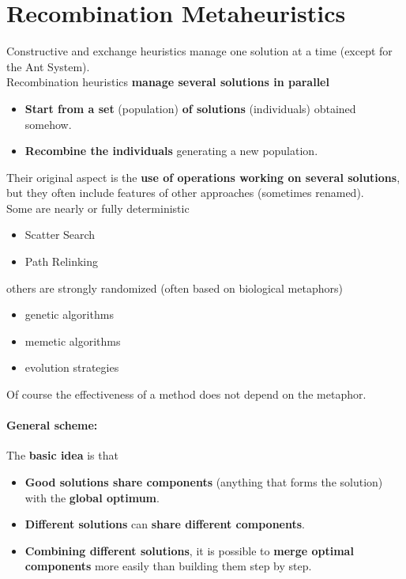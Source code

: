 \section{Recombination Metaheuristics}

Constructive and exchange heuristics manage one solution at a time (except for the Ant System).\\

Recombination heuristics \textbf{manage several solutions in parallel}
\begin{itemize}
	\item \textbf{Start from a set} (population) \textbf{of solutions} (individuals) obtained somehow.\\
	
	\item \textbf{Recombine the individuals} generating a new population.\\
\end{itemize}

Their original aspect is the \textbf{use of operations working on several solutions}, but they often include features of other approaches (sometimes renamed).\\

Some are nearly or fully deterministic
\begin{itemize}
	\item Scatter Search
	\item Path Relinking
\end{itemize}

others are strongly randomized (often based on biological metaphors)
\begin{itemize}
	\item genetic algorithms
	\item memetic algorithms
	\item evolution strategies
\end{itemize}

Of course the effectiveness of a method does not depend on the metaphor.\\

\newpage

\paragraph{General scheme:} The \textbf{basic idea} is that
\begin{itemize}
	\item \textbf{Good solutions share components} (anything that forms the solution) with the \textbf{global optimum}.\\
	
	\item \textbf{Different solutions} can \textbf{share different components}.\\
	
	\item \textbf{Combining different solutions}, it is possible to \textbf{merge optimal components} more easily than building them step by step.\\
\end{itemize}

